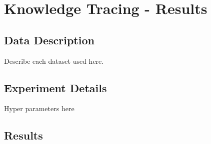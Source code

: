 \section{Knowledge Tracing - Results}

\subsection{Data Description}
Describe each dataset used here.

\subsection{Experiment Details}
Hyper parameters here

\subsection{Results}
